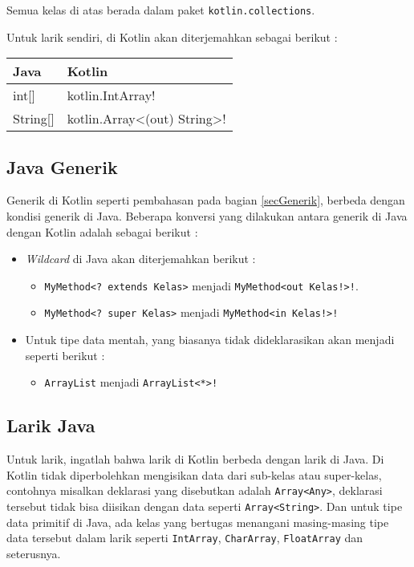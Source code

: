 Semua kelas di atas berada dalam paket \texttt{kotlin.collections}.

Untuk larik sendiri, di Kotlin akan diterjemahkan sebagai berikut :

\begin{center}
\begin{tabular}{|l|l|}
\hline
\textbf{Java} & \textbf{Kotlin} \\
\hline
int[] & kotlin.IntArray! \\
\hline
String[] & kotlin.Array<(out) String>! \\
\hline
\end{tabular}
\end{center}

\subsection{Java Generik}

Generik di Kotlin seperti pembahasan pada bagian \ref{secGenerik}, berbeda dengan kondisi generik di Java. Beberapa konversi yang dilakukan antara generik di Java dengan Kotlin adalah sebagai berikut :

\begin{itemize}
	\item \textit{Wildcard} di Java akan diterjemahkan berikut :
		\begin{itemize}
			\item \texttt{MyMethod<? extends Kelas>} menjadi \texttt{MyMethod<out Kelas!>!}.
			\item \texttt{MyMethod<? super Kelas>} menjadi \texttt{MyMethod<in Kelas!>!}
		\end{itemize}	
	\item Untuk tipe data mentah, yang biasanya tidak dideklarasikan akan menjadi seperti berikut :
		\begin{itemize}
			\item \texttt{ArrayList} menjadi \texttt{ArrayList<*>!}
		\end{itemize}
\end{itemize}

\subsection{Larik Java}

Untuk larik, ingatlah bahwa larik di Kotlin berbeda dengan larik di Java. Di Kotlin tidak diperbolehkan mengisikan data dari sub-kelas atau super-kelas, contohnya misalkan deklarasi yang disebutkan adalah \texttt{Array<Any>}, deklarasi tersebut tidak bisa diisikan dengan data seperti \texttt{Array<String>}. Dan untuk tipe data primitif di Java, ada kelas yang bertugas menangani masing-masing tipe data tersebut dalam larik seperti \texttt{IntArray}, \texttt{CharArray}, \texttt{FloatArray} dan seterusnya.


